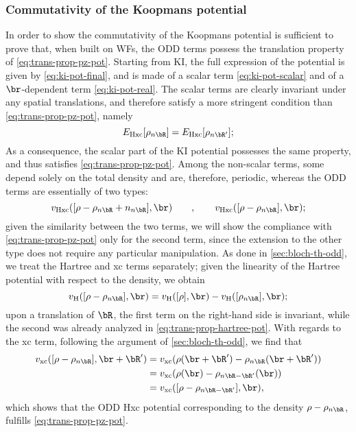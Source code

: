 \subsubsection*{Commutativity of the Koopmans potential}
In order to show the commutativity of the Koopmans potential is sufficient to prove that, when built on WFs, the ODD terms possess the translation property of \cref{eq:trans-prop-pz-pot}. Starting from KI, the full expression of the potential is given by \cref{eq:ki-pot-final}, and is made of a scalar term \eqref{eq:ki-pot-scalar} and of a $\br$-dependent term \eqref{eq:ki-pot-real}. The scalar terms are clearly invariant under any spatial translations, and therefore satisfy a more stringent condition than \cref{eq:trans-prop-pz-pot}, namely
%
\begin{equation}
    E_{\rm Hxc}[\rho_{n\bR}] = E_{\rm Hxc}[\rho_{n\bR'}] ;
\end{equation}
%
As a consequence, the scalar part of the KI potential possesses the same property, and thus satisfies \cref{eq:trans-prop-pz-pot}. Among the non-scalar terms, some depend solely on the total density and are, therefore, periodic, whereas the ODD terms are essentially of two types:
%
\begin{equation}
    v_{\rm Hxc}([\rho-\rho_{n\bR}+n_{n\bR}],\br)
    \qquad , \qquad
    v_{\rm Hxc}([\rho-\rho_{n\bR}],\br) ;
\end{equation}
%
given the similarity between the two terms, we will show the compliance with \cref{eq:trans-prop-pz-pot} only for the second term, since the extension to the other type does not require any particular manipulation. As done in \cref{sec:bloch-th-odd}, we treat the Hartree and xc terms separately; given the linearity of the Hartree potential with respect to the density, we obtain
%
\begin{equation}
    v_{\rm H}([\rho-\rho_{n\bR}],\br) = v_{\rm H}([\rho],\br) - v_{\rm H}([\rho_{n\bR}],\br) ;
\end{equation}
%
upon a translation of $\bR$, the first term on the right-hand side is invariant, while the second was already analyzed in \cref{eq:trans-prop-hartree-pot}. With regards to the xc term, following the argument of \cref{sec:bloch-th-odd}, we find that
%
\begin{equation}
    \begin{split}
        v_{\rm xc}([\rho-\rho_{n\bR}],\br+\bR') &= v_{\rm xc} (\rho(\br+\bR') - \rho_{n\bR}(\br+\bR')) \\
        &= v_{\rm xc}(\rho(\br) - \rho_{n\bR-\bR'}(\br)) \\
        &= v_{\rm xc}([\rho-\rho_{n\bR-\bR'}],\br) ,
    \end{split}
\end{equation}
%
which shows that the ODD Hxc potential corresponding to the density $\rho-\rho_{n\bR}$, fulfills \cref{eq:trans-prop-pz-pot}.

